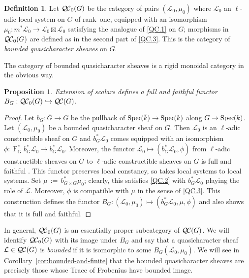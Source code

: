 \documentclass{amsart}
\theoremstyle{plain}
\newtheorem{proposition}[theorem]{Proposition}
\theoremstyle{definition}
\newtheorem{definition}[theorem]{Definition}
\theoremstyle{remark}
\newcommand{\bFq}{\bar{k}}
\newcommand{\Fq}{k}
\newcommand{\Frob}[1]{\operatorname{F}_{#1}}
\newcommand{\Spec}[1]{{\operatorname{Spec}\hskip-1pt( #1 )}}
\newcommand{\ceq}{{\, :=\, }}
\newcommand{\qcs}[1]{{\mathcal{#1}}}
\newcommand{\gqcs}[1]{{\mathcal{\bar #1}}}
\newcommand{\QC}{{\mathcal{Q\hskip-0.8pt C}}}
\newcommand{\QCb}{{\QC_0}}
\begin{document}
\begin{definition}
Let $\QCb(G)$ be the category of pairs $(\qcs{L}_0,\mu_0)$
where $\qcs{L}_0$ an $\ell$-adic local system on $G$ of rank~one,
equipped with an isomorphism $\mu_0 : m^* \qcs{L}_0 \to \qcs{L}_0 \boxtimes \qcs{L}_0$
satisfying the analogue of \ref{QC.1} on $G$;
morphisms in $\QCb(G)$ are defined as in the second part of
\ref{QC.3}.
This is the category of \emph{bounded quasicharacter sheaves} on $G$.
\end{definition}

The category of bounded quasicharacter sheaves is a rigid monoidal category in the obvious way.

\begin{proposition}\label{prop:BG}
Extension of scalars defines a full and faithful functor
$B_G : \QCb(G) \hookrightarrow \QC(G)$.
\end{proposition}

\begin{proof}
 Let $b_G : {\bar G} \to G$ be the pullback of $\Spec{\bFq} \to \Spec{\Fq}$ along $G\to \Spec{\Fq}$.
 Let $(\qcs{L}_0,\mu_0)$ be a bounded quasicharacter sheaf on $G$.
 Then $\qcs{L}_0$ is an $\ell$-adic constructible sheaf on $G$ and
 $b_G^* \qcs{L}_0$ comes equipped with an isomorphism
 $\phi : \Frob{G}^* b_G^*\qcs{L}_0 \to b_G^* \qcs{L}_0$.
 Moreover, the functor $\qcs{L}_0 \mapsto (b_G^* \qcs{L}_0,\phi)$
 from $\ell$-adic constructible sheaves on $G$ to $\ell$-adic constructible sheaves on $G$
 is full and faithful .
 This functor preserves local constancy, so takes local systems to local systems.
 Set $\mu \ceq b_{G\times G}^*\mu_0$; clearly, this satisfies \ref{QC.2}
 with $b_G^*\qcs{L}_0$ playing the role of $\gqcs{L}$.
 Moreover, $\phi$ is compatible with $\mu$ in the sense of \ref{QC.3}.
 This construction defines the functor $B_G : (\qcs{L}_0,\mu_0) \mapsto (b_G^*\qcs{L}_0,\mu, \phi)$
 and also shows that it is full and faithful.
\end{proof}

In general, $\QCb(G)$ is an essentially
proper subcategory of $\QC(G)$. We will identify $\QCb(G)$ with its image under $B_G$
and say that a quasicharacter sheaf $\qcs{L} \in \QC(G)$ is \emph{bounded}
if it is isomorphic to some $B_G(\qcs{L}_0, \mu_0)$.
We will see in Corollary~\ref{cor:bounded-and-finite} that the bounded quasicharacter sheaves
are precisely those whose Trace of Frobenius have bounded image.
\end{document}

